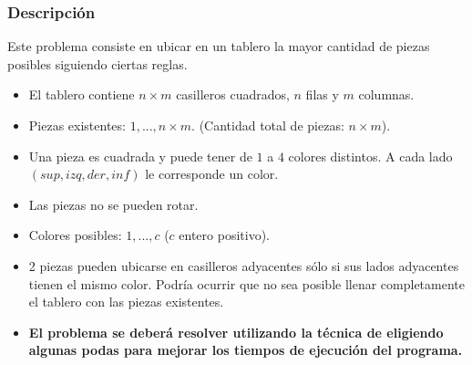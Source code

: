 \documentclass[11pt, a4paper, twoside]{article}
\begin{document}
{}

\subsubsection{Descripción}

Este problema consiste en ubicar en un tablero la mayor cantidad de piezas
posibles siguiendo ciertas reglas.


\begin{itemize}   
	\item El tablero contiene $n \times m$ casilleros cuadrados, $n$ filas y $m$
	columnas.

	\item Piezas existentes: $1,...,n \times m$. (Cantidad total de
	piezas: $n \times m$).

	\item Una pieza es cuadrada y puede tener de $1$ a $4$ colores distintos.
	A cada lado $(sup, izq, der, inf)$ le corresponde un color.

	\item Las piezas no se pueden rotar.

	\item Colores posibles: $1,...,c$ ($c$ entero positivo).

	\item 2 piezas pueden ubicarse en casilleros adyacentes sólo si sus lados
	adyacentes tienen el mismo color. Podría ocurrir que no sea posible
	llenar completamente el tablero con las piezas existentes.



  \item \textbf{El problema se deberá resolver utilizando la técnica de
     eligiendo algunas podas para mejorar los tiempos de
    ejecución del programa.}

\end{itemize}

\end{document}
